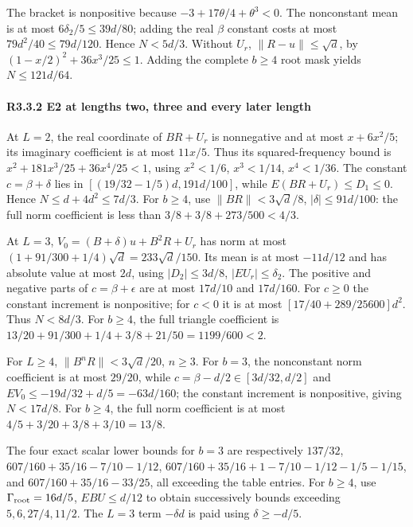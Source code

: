 The bracket is nonpositive because \(-3+17\theta/4+\theta^3<0\). The nonconstant mean is at most \(6 \delta_2/5\le39d/80\); adding the real \(\beta\) constant costs at most \(79d^2/40\le79d/120\). Hence \(N<5d/3\). Without \(U_r\), \(\|R-u\|\le\sqrt d\), by \((1-x/2)^2+36x^3/25\le1\). Adding the complete \(b\ge4\) root mask yields \(N\le121d/64\).

\paragraph{R3.3.2 E2 at lengths two, three and every later length}

At \(L=2\), the real coordinate of \(BR+U_r\) is nonnegative and at most \(x+6x^2/5\); its imaginary coefficient is at most \(11x/5\). Thus its squared-frequency bound is \(x^2+181x^3/25+36x^4/25<1\), using \(x^2<1/6\), \(x^3<1/14\), \(x^4<1/36\). The constant \(c=\beta+\delta\) lies in \([(19/32-1/5)d,\allowbreak \allowbreak  191d/100]\), while \(E(BR+U_r)\le D_1\le0\). Hence \(N\le d+4d^2\le7d/3\). For \(b\ge4\), use \(\|BR\|<3\sqrt d/8\), \(|\delta|\le91d/100\): the full norm coefficient is less than \(3/8+3/8+273/500<4/3\).

At \(L=3\), \(V_0=(B+\delta)u+B^2R+U_r\) has norm at most \((1+91/300+1/4)\sqrt d=233\sqrt d/150\). Its mean is at most \(-11d/12\) and has absolute value at most \(2d\), using \(|D_2|\le3d/8\), \(|EU_r|\le \delta_2\). The positive and negative parts of \(c=\beta+\epsilon\) are at most \(17d/10\) and \(17d/160\). For \(c\ge0\) the constant increment is nonpositive; for \(c<0\) it is at most \([17/40+289/25600]d^2\). Thus \(N<8d/3\). For \(b\ge4\), the full triangle coefficient is \(13/20+91/300+1/4+3/8+21/50=1199/600<2\).

For \(L\ge4\), \(\|B^nR\|<3\sqrt d/20\), \(n\ge3\). For \(b=3\), the nonconstant norm coefficient is at most \(29/20\), while \(c=\beta-d/2\in[3d/32,\allowbreak \allowbreak  d/2]\) and \(EV_0\le-19d/32+d/5=-63d/160\); the constant increment is nonpositive, giving \(N<17d/8\). For \(b\ge4\), the full norm coefficient is at most \(4/5+3/20+3/8+3/10=13/8\).

The four exact scalar lower bounds for \(b=3\) are respectively \(137/32\), \(607/160+35/16-7/10-1/12\), \(607/160+35/16+1-7/10-1/12-1/5-1/15\), and \(607/160+35/16-33/25\), all exceeding the table entries. For \(b\ge4\), use \(\Gamma_{\rm root}=16d/5\), \(EBU\le d/12\) to obtain successively bounds exceeding \(5,\allowbreak \allowbreak  6,\allowbreak \allowbreak  27/4,\allowbreak \allowbreak  11/2\). The \(L=3\) term \(-\delta d\) is paid using \(\delta\ge-d/5\).

